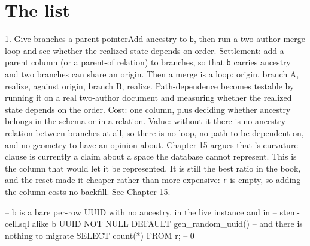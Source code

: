 \section{The list}

\begin{Open}{1. Give branches a parent pointer}{Add ancestry to \texttt{b}, then run a two-author merge loop and see whether the realized state depends on order.}
Settlement: add a parent column (or a parent-of relation) to branches, so that \texttt{b} carries ancestry and two branches can share an origin. Then a merge is a loop: origin, branch A, realize, against origin, branch B, realize. Path-dependence becomes testable by running it on a real two-author document and measuring whether the realized state depends on the order. Cost: one column, plus deciding whether ancestry belongs in the schema or in a relation. Value: without it there is no ancestry relation between branches at all, so there is no loop, no path to be dependent on, and no geometry to have an opinion about. Chapter 15 argues that 's curvature clause is currently a claim about a space the database cannot represent. This is the column that would let it be represented. It is still the best ratio in the book, and the reset made it cheaper rather than more expensive: \texttt{r} is empty, so adding the column costs no backfill. See Chapter 15.
\begin{Check}
-- b is a bare per-row UUID with no ancestry, in the live instance and in
-- stem-cell.sql alike
b UUID NOT NULL DEFAULT gen_random_uuid()
-- and there is nothing to migrate
SELECT count(*) FROM r;   -- 0
\end{Check}
\end{Open}

